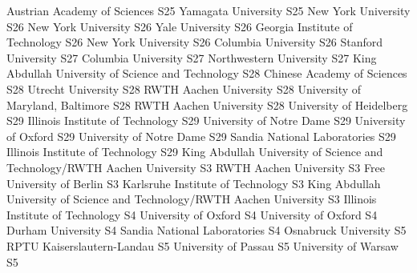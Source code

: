 \begin{multicols}{2}
{Austrian Academy of Sciences}
{S25}
{}
{Yamagata University}
{S25}
{}
{New York University}
{S26}
{}
{New York University}
{S26}
{}
{Yale University}
{S26}
{}
{Georgia Institute of Technology}
{S26}
{}
{New York University}
{S26}
{}
{Columbia University}
{S26}
{}
{Stanford University}
{S27}
{}
{Columbia University}
{S27}
{}
{Northwestern University}
{S27}
{}
{King Abdullah University of Science and Technology}
{S28}
{}
{Chinese Academy of Sciences}
{S28}
{}
{Utrecht University}
{S28}
{}
{RWTH Aachen University}
{S28}
{}
{University of Maryland, Baltimore}
{S28}
{}
{RWTH Aachen University}
{S28}
{}
{University of Heidelberg}
{S29}
{}
{Illinois Institute of Technology}
{S29}
{}
{University of Notre Dame}
{S29}
{}
{University of Oxford}
{S29}
{}
{University of Notre Dame}
{S29}
{}
{Sandia National Laboratories}
{S29}
{}
{Illinois Institute of Technology}
{S29}
{}
{King Abdullah University of Science and Technology/RWTH Aachen University}
{S3}
{}
{RWTH Aachen University}
{S3}
{}
{Free University of Berlin}
{S3}
{}
{Karlsruhe Institute of Technology}
{S3}
{}
{King Abdullah University of Science and Technology/RWTH Aachen University}
{S3}
{}
{Illinois Institute of Technology}
{S4}
{}
{University of Oxford}
{S4}
{}
{University of Oxford}
{S4}
{}
{Durham University}
{S4}
{}
{Sandia National Laboratories}
{S4}
{}
{Osnabruck University}
{S5}
{}
{RPTU Kaiserslautern-Landau}
{S5}
{}
{University of Passau}
{S5}
{}
{University of Warsaw}
{S5}

\end{multicols}
